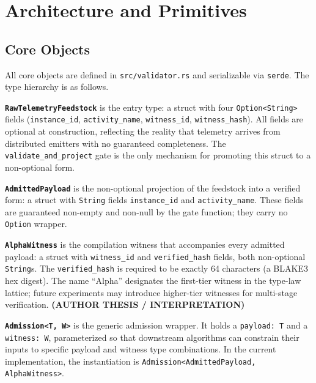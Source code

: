 
\section{Architecture and Primitives}
\label{sec:otel-weaver-exp-003-live-check-to-refusal-architecture}

\subsection{Core Objects}
\label{sec:otel-weaver-exp-003-live-check-to-refusal-architecture-objects}

All core objects are defined in \texttt{src/validator.rs} and serializable via
\texttt{serde}. The type hierarchy is as follows.

\textbf{\texttt{RawTelemetryFeedstock}} is the entry type: a struct with four
\texttt{Option<String>} fields (\texttt{instance\_id}, \texttt{activity\_name},
\texttt{witness\_id}, \texttt{witness\_hash}). All fields are optional at construction,
reflecting the reality that telemetry arrives from distributed emitters with no
guaranteed completeness. The \texttt{validate\_and\_project} gate is the only
mechanism for promoting this struct to a non-optional form.

\textbf{\texttt{AdmittedPayload}} is the non-optional projection of the feedstock
into a verified form: a struct with \texttt{String} fields \texttt{instance\_id}
and \texttt{activity\_name}. These fields are guaranteed non-empty and non-null
by the gate function; they carry no \texttt{Option} wrapper.

\textbf{\texttt{AlphaWitness}} is the compilation witness that accompanies every
admitted payload: a struct with \texttt{witness\_id} and \texttt{verified\_hash}
fields, both non-optional \texttt{String}s. The \texttt{verified\_hash} is required
to be exactly 64 characters (a BLAKE3 hex digest). The name ``Alpha'' designates the
first-tier witness in the type-law lattice; future experiments may introduce higher-tier
witnesses for multi-stage verification. \textbf{(AUTHOR THESIS / INTERPRETATION)}

\textbf{\texttt{Admission<T, W>}} is the generic admission wrapper. It holds a
\texttt{payload: T} and a \texttt{witness: W}, parameterized so that downstream
algorithms can constrain their inputs to specific payload and witness type combinations.
In the current implementation, the instantiation is
\texttt{Admission<AdmittedPayload, AlphaWitness>}.

